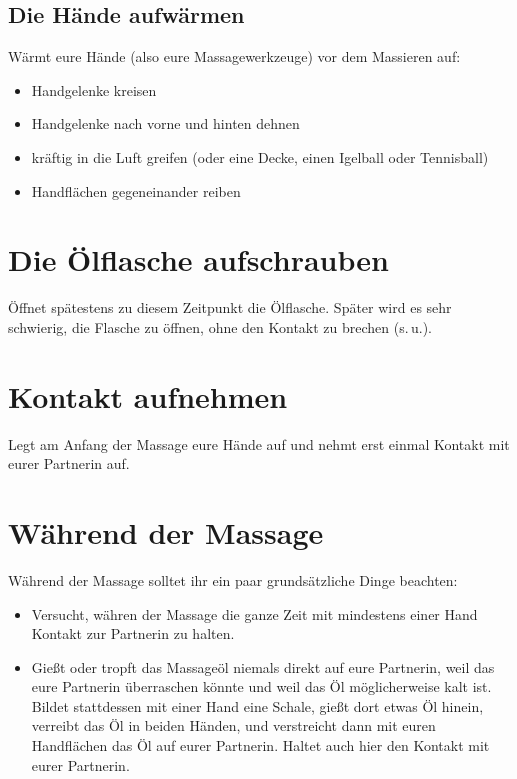 \subsection{Die Hände aufwärmen}

Wärmt eure Hände (also eure Massagewerkzeuge) vor dem Massieren auf:

\begin{itemize}
  \item Handgelenke kreisen
  \item Handgelenke nach vorne und hinten dehnen
  \item kräftig in die Luft greifen (oder eine Decke, einen Igelball oder Tennisball)
  \item Handflächen gegeneinander reiben
\end{itemize}


\section{Die Ölflasche aufschrauben}

Öffnet spätestens zu diesem Zeitpunkt die Ölflasche. Später wird es sehr schwierig, die Flasche zu öffnen, ohne den Kontakt zu brechen (s.\,u.).

\section{Kontakt aufnehmen}

Legt am Anfang der Massage eure Hände auf und nehmt erst einmal Kontakt mit eurer Partnerin auf.


\section{Während der Massage}

Während der Massage solltet ihr ein paar grundsätzliche Dinge beachten:

\begin{itemize}
	\item Versucht, währen der Massage die ganze Zeit mit mindestens einer Hand Kontakt zur Partnerin zu halten.
	\item Gießt oder tropft das Massageöl niemals direkt auf eure Partnerin, weil das eure Partnerin überraschen könnte und weil das Öl möglicherweise kalt ist. Bildet stattdessen mit einer Hand eine Schale, gießt dort etwas Öl hinein, verreibt das Öl in beiden Händen, und verstreicht dann mit euren Handflächen das Öl auf eurer Partnerin. Haltet auch hier den Kontakt mit eurer Partnerin.
\end{itemize}


